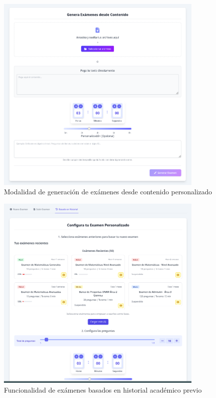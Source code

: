 \documentclass[12pt,a4paper]{report}
\begin{document}
\begin{figure}[h]
\centering
\includegraphics[width=0.9\textwidth]{assets/250617_06h45m50s_screenshot.png}
\caption{Modalidad de generación de exámenes desde contenido personalizado}
\label{fig:generacion-contenido}
\end{figure}

\begin{figure}[h]
\centering
\includegraphics[width=0.9\textwidth]{assets/250617_06h46m12s_screenshot.png}
\caption{Funcionalidad de exámenes basados en historial académico previo}
\label{fig:examenes-historial}
\end{figure}
\end{document}
